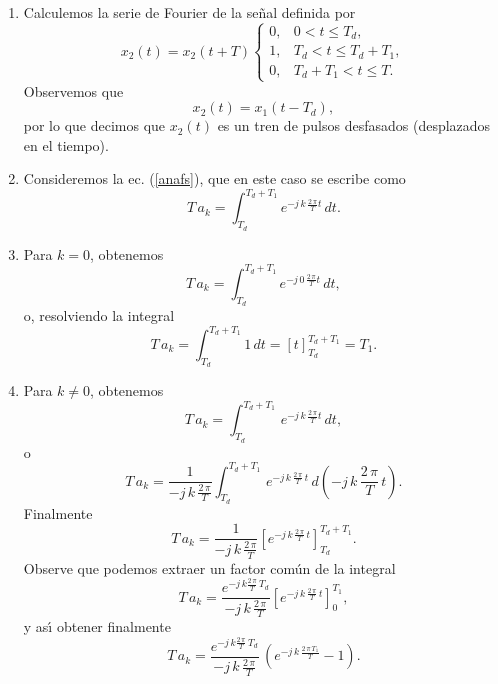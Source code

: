 \begin{enumerate}
\item  Calculemos la serie de Fourier de la se\~{n}al definida por 
\begin{equation}
x_{2}\left( t\right) = x_{2}\left(t + T\right) \left\{ 
\begin{array}{cc}
0, & 0 < t \leq T_{d}, \\
1, & T_{d} < t \leq T_{d} + T_{1}, \\ 
0, & T_{d} + T_{1} < t \leq T.
\end{array}
\right.
\end{equation}
Observemos que
\begin{equation}
x_{2}(t) = x_{1}(t - T_{d}),
\end{equation}
por lo que decimos que $x_{2}(t)$ es un tren de pulsos desfasados (desplazados en el tiempo).

\item Consideremos la ec. (\ref{anafs}), que en este caso se escribe como
\begin{equation}
T \, a_{k}=\int_{T_{d}}^{T_{d} + T_{1}} e^{-j \, k \, \frac{2 \, \pi }{T}t} \, dt.
\end{equation}

\item Para $k = 0$, obtenemos
\begin{equation}
T \, a_{k}=\int_{T_{d}}^{T_{d} + T_{1}} e^{-j \, 0 \, \frac{2 \, \pi }{T}t} \, dt,
\end{equation}
o, resolviendo la integral
\begin{equation}
T \, a_{k}=\int_{T_{d}}^{T_{d} + T_{1}} 1 \, dt = \left[ t \right]_{T_{d}}^{T_{d}+T_{1}} = T_{1}.
\end{equation}

\item Para $k \neq 0$, obtenemos
\begin{equation}
T \, a_{k}=\int_{T_{d}}^{T_{d} + T_{1}} \, e^{-j \, k \, \frac{2 \, \pi }{T}t} \, dt,
\end{equation}
o
\begin{equation}
T \, a_{k}=\frac{1}{-j \, k \, \frac{2 \, \pi }{T}} \int_{T_{d}}^{T_{d} + T_{1}} \, e^{-j \, k \, \frac{2 \, \pi }{T}\,t} \, d(-j \, k \, \frac{2 \, \pi }{T} \, t).
\end{equation}
Finalmente
\begin{equation}
T \, a_{k}=\frac{1}{-j \, k \, \frac{2 \, \pi }{T}}  \left[e^{-j \, k \, \frac{2 \, \pi }{T}\,t} \right]_{T_{d}}^{T_{d} + T_{1}}.
\end{equation}
Observe que podemos extraer un factor com\'{u}n de la integral
\begin{equation}
T \, a_{k}=\frac{e^{-j \, k \frac{2 \, \pi}{T} \, T_{d}}}{-j \, k \, \frac{2 \, \pi }{T}} \left[e^{-j \, k \, \frac{2 \, \pi }{T}\,t} \right]_{0}^{T_{1}},
\end{equation}
y as\'{\i} obtener finalmente
\begin{equation}
T \, a_{k}=\frac{e^{-j \, k \frac{2 \, \pi}{T} \, T_{d}}}{-j \, k \, \frac{2 \, \pi }{T}} \, 
\left(e^{-j \, k \, \frac{2 \, \pi \, T_{1}}{T}} - 1\right).
\end{equation}


\end{enumerate}
